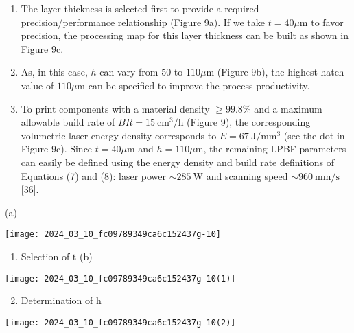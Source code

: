 \documentclass[10pt]{article}
\begin{document}
\begin{enumerate}
  \item The layer thickness is selected first to provide a required precision/performance relationship (Figure 9a). If we take $t=40 \mu \mathrm{m}$ to favor precision, the processing map for this layer thickness can be built as shown in Figure 9c.

  \item As, in this case, $h$ can vary from 50 to $110 \mu \mathrm{m}$ (Figure 9b), the highest hatch value of $110 \mu \mathrm{m}$ can be specified to improve the process productivity.

  \item To print components with a material density $\geq 99.8 \%$ and a maximum allowable build rate of $B R=15 \mathrm{~cm}^{3} / \mathrm{h}$ (Figure 9), the corresponding volumetric laser energy density corresponds to $E=67 \mathrm{~J} / \mathrm{mm}^{3}$ (see the dot in Figure 9c). Since $t=40 \mu \mathrm{m}$ and $h=110 \mu \mathrm{m}$, the remaining LPBF parameters can easily be defined using the energy density and build rate definitions of Equations (7) and (8): laser power $\sim 285 \mathrm{~W}$ and scanning speed $\sim 960 \mathrm{~mm} / \mathrm{s}$ [36].

\end{enumerate}

(a)

\begin{center}
\texttt{[image: 2024\_03\_10\_fc09789349ca6c152437g-10]}
\end{center}

\begin{enumerate}
  \item Selection of $\mathrm{t}$ (b)
\end{enumerate}

\begin{center}
\texttt{[image: 2024\_03\_10\_fc09789349ca6c152437g-10(1)]}
\end{center}

\begin{enumerate}
  \setcounter{enumi}{1}
  \item Determination of $\mathrm{h}$
\end{enumerate}

\begin{center}
\texttt{[image: 2024\_03\_10\_fc09789349ca6c152437g-10(2)]}
\end{center}
\end{document}

